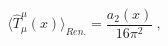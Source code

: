 \begin{equation}
\langle\hat{T}_\mu^\mu(x)\rangle_{Ren.}=\frac{a_2(x)}{16\pi^2} \ ,
\label{47}
\end{equation}

